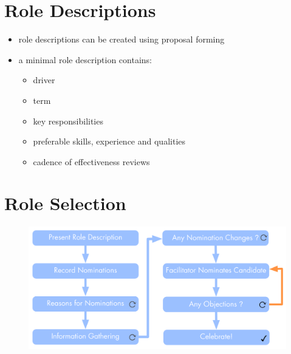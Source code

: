 \section{Role Descriptions}
\label{roledescriptions}

\begin{itemize}
\item role descriptions can be created using proposal forming

\item a minimal role description contains:

\begin{itemize}
\item driver

\item term

\item key responsibilities

\item preferable skills, experience and qualities

\item cadence of effectiveness reviews

\end{itemize}

\end{itemize}

\section{Role Selection}
\label{roleselection}

\begin{figure}[htbp]
\centering
\includegraphics[keepaspectratio,width=\textwidth,height=0.75\textheight]{img/people-and-roles/elections.png}
\end{figure}

